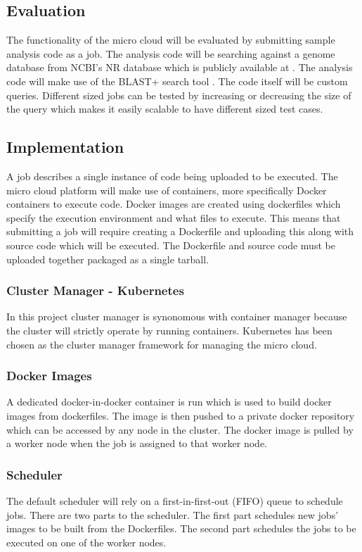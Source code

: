 \documentclass{sig-alternate-05-2015}
\begin{document}
\subsection{Evaluation}
The functionality of the micro cloud will be evaluated by submitting sample analysis code as a job. The analysis code will be searching against a genome database from NCBI's NR database which is publicly available at \cite{ncbinrdb}. The analysis code will make use of the BLAST+ search tool \cite{camacho2009blast}. The code itself will be custom queries. Different sized jobs can be tested by increasing or decreasing the size of the query which makes it easily scalable to have different sized test cases.



\subsection{Implementation}


A job describes a single instance of code being uploaded to be executed. 
The micro cloud platform will make use of containers, more specifically Docker containers to execute code. Docker images are created using dockerfiles which specify the execution environment and what files to execute. This means that submitting a job will require creating a Dockerfile and uploading this along with source code which will be executed. The Dockerfile and source code must be uploaded together packaged as a single tarball.  

\subsubsection{Cluster Manager - Kubernetes}
In this project cluster manager is synonomous with container manager because the cluster will strictly operate by running containers. Kubernetes has been chosen as the cluster manager framework for managing the micro cloud.

\subsubsection{Docker Images}
A dedicated docker-in-docker container is run which is used to build docker images from dockerfiles. The image is then pushed to a private docker repository which can be accessed by any node in the cluster. The docker image is pulled by a worker node when the job is assigned to that worker node.

\subsubsection{Scheduler}
The default scheduler will rely on a first-in-first-out (FIFO) queue to schedule jobs. There are two parts to the scheduler. The first part schedules new jobs' images to be built from the Dockerfiles. The second part schedules the jobs to be executed on one of the worker nodes.
\end{document}
